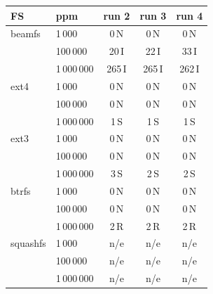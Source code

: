 \begin{tabular}{@{}llccc@{}}
\toprule
FS & ppm & run 2 & run 3 & run 4 \\
\midrule
beamfs & 1\,000 & 0\,N & 0\,N & 0\,N \\
 & 100\,000 & 20\,I & 22\,I & 33\,I \\
 & 1\,000\,000 & 265\,I & 265\,I & 262\,I \\
\addlinespace[2pt]
ext4 & 1\,000 & 0\,N & 0\,N & 0\,N \\
 & 100\,000 & 0\,N & 0\,N & 0\,N \\
 & 1\,000\,000 & 1\,S & 1\,S & 1\,S \\
\addlinespace[2pt]
ext3 & 1\,000 & 0\,N & 0\,N & 0\,N \\
 & 100\,000 & 0\,N & 0\,N & 0\,N \\
 & 1\,000\,000 & 3\,S & 2\,S & 2\,S \\
\addlinespace[2pt]
btrfs & 1\,000 & 0\,N & 0\,N & 0\,N \\
 & 100\,000 & 0\,N & 0\,N & 0\,N \\
 & 1\,000\,000 & 2\,R & 2\,R & 2\,R \\
\addlinespace[2pt]
squashfs & 1\,000 & n/e & n/e & n/e \\
 & 100\,000 & n/e & n/e & n/e \\
 & 1\,000\,000 & n/e & n/e & n/e \\
\bottomrule
\end{tabular}

